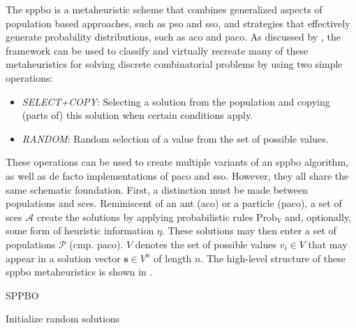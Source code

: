 The \gls{sppbo} is a metaheuristic scheme that combines generalized aspects of population based approaches, such as \gls{pso} and \gls{sso}, and strategies that effectively generate probability distributions, such as \gls{aco} and \gls{paco}. As discussed by \citet{lin2015simple}, the framework can be used to classify and virtually recreate many of these metaheuristics for solving discrete combinatorial problems by using two simple operations: 
\begin{itemize}
	\item \textit{SELECT+COPY}: Selecting a solution from the population and copying (parts of) this solution when certain conditions apply.
	\item \textit{RANDOM}: Random selection of a value from the set of possible values.
\end{itemize}
These operations can be used to create multiple variants of an \gls{sppbo} algorithm, as well as de facto implementations of \gls{paco} and \gls{sso}. However, they all share the same schematic foundation. First, a distinction must be made between populations and \glspl{sce}. Reminiscent of an ant (\gls{aco}) or a particle (\gls{paco}),  a set of \glspl{sce} $\mathcal{A}$ create the solutions by applying probabilistic rules $\text{Prob}_V$ and, optionally, some form of heuristic information $\eta$. These solutions may then enter a set of populations $\mathcal{P}$ (cmp. \gls{paco}). $V$ denotes the set of possible values $v_i \in V$ that may appear in a solution vector $\textbf{s} \in V^n$ of length $n$. 
The high-level structure of these \gls{sppbo} metaheuristics is shown in .

\begin{algorithm}
	\caption{SPPBO}
	\label{alg:sppbo}
	\begin{algorithmic}
		\State Initialize random solutions
		\Repeat
			\State {}
		\EndFor
			\State {}
		\EndFor
	\end{algorithmic}
\end{algorithm}

